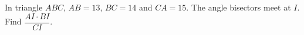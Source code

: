 In triangle $ABC$, $AB=13$, $BC=14$ and $CA=15$. The angle bisectors meet at $I$. Find $\dfrac{AI\cdot BI}{CI}$.
